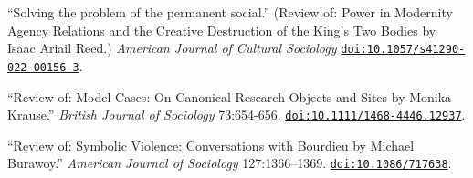 
\ind ``Solving the problem of the permanent social.'' (Review of: Power in Modernity
Agency Relations and the Creative Destruction of the King’s Two Bodies
by Isaac Ariail Reed.) {\em American Journal of Cultural Sociology} \href{https://doi.org/10.1057/s41290-022-00156-3}{\nolinkurl{doi:10.1057/s41290-022-00156-3}}.

\ind ``Review of: Model Cases: On Canonical Research Objects and Sites by Monika Krause.'' {\em British Journal of Sociology} 73:654-656. \href{https://doi.org/10.1111/1468-4446.12937}{\nolinkurl{doi:10.1111/1468-4446.12937}}. 

\ind ``Review of: Symbolic Violence: Conversations with Bourdieu by Michael Burawoy.'' {\em American Journal of Sociology} 127:1366–1369. \href{https://doi.org/10.1086/717638}{\nolinkurl{doi:10.1086/717638}}.
